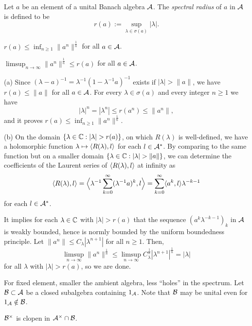 \documentclass{../../large}
\begin{document}
\begin{prb}
Let $a$ be an element of a unital Banach algebra $\mathcal{A}$.
The \emph{spectral radius} of $a$ in $\mathcal{A}$ is defined to be
\[r(a):=\sup_{\lambda\in\sigma(a)}|\lambda|.\]
\begin{parts}
\item $r(a)\le\inf_{n\ge1}\|a^n\|^{\frac1n}$ for all $a\in\mathcal{A}$.
\item $\limsup_{n\to\infty}\|a^n\|^{\frac1n}\le r(a)$ for all $a\in\mathcal{A}$.
\end{parts}
\end{prb}
\begin{pf}
(a)
Since $(\lambda-a)^{-1}=\lambda^{-1}(1-\lambda^{-1}a)^{-1}$ exists if $|\lambda|>\|a\|$, we have $r(a)\le\|a\|$ for all $a\in\mathcal{A}$.
For every $\lambda\in\sigma(a)$ and every integer $n\ge1$ we have
\[|\lambda|^n=|\lambda^n|\le r(a^n)\le\|a^n\|,\]
and it proves $r(a)\le\inf_{n\ge1}\|a^n\|^{\frac1n}$.

(b)
On the domain $\{\lambda\in\C:|\lambda|>r(a)\}$, on which $R(\lambda)$ is well-defined, we have a holomorphic function $\lambda\mapsto\langle R(\lambda),l\rangle$ for each $l\in\mathcal{A}^*$.
By comparing to the same function but on a smaller domain $\{\lambda\in\C:|\lambda|>\|a\|\}$, we can determine the coefficients of the Laurent series of $\langle R(\lambda),l\rangle$ at infinity as
\[\langle R(\lambda),l\rangle=\Bigl\langle\lambda^{-1}\sum_{k=0}^\infty(\lambda^{-1}a)^k,l\Bigr\rangle=\sum_{k=0}^\infty\langle a^k,l\rangle\lambda^{-k-1}\]
for each $l\in\mathcal{A}^*$.

It implies for each $\lambda\in\mathbb{C}$ with $|\lambda|>r(a)$ that the sequence $(a^k\lambda^{-k-1})_k$ in $\mathcal{A}$ is weakly bounded, hence is normly bounded by the uniform boundedness principle.
Let $\|a^n\|\le C_\lambda|\lambda^{n+1}|$ for all $n\ge1$.
Then,
\[\limsup_{n\to\infty}\|a^n\|^{\frac1n}\le\limsup_{n\to\infty}C_\lambda^{\frac1n}|\lambda^{n+1}|^{\frac1n}=|\lambda|\]
for all $\lambda$ with $|\lambda|>r(a)$, so we are done.
\end{pf}

\begin{prb}
For fixed element, smaller the ambient algebra, less ``holes'' in the spectrum.
Let $\mathcal{B}\subset\mathcal{A}$ be a closed subalgebra containing $1_{\mathcal{A}}$.
Note that $\mathcal{B}$ may be unital even for $1_{\mathcal{A}}\notin\mathcal{B}$.
\begin{parts}
\item $\mathcal{B}^\times$ is clopen in $\mathcal{A}^\times\cap\mathcal{B}$.
\end{parts}
\end{prb}
\end{document}
